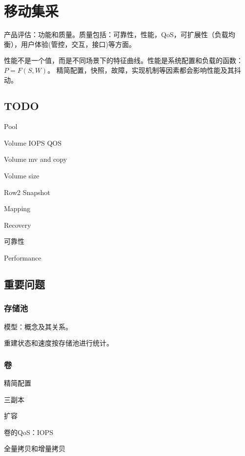 \chapter{移动集采}

产品评估：功能和质量。质量包括：可靠性，性能，QoS，可扩展性（负载均衡），用户体验(管控，交互，接口)等方面。

性能不是一个值，而是不同场景下的特征曲线。性能是系统配置和负载的函数：$P=F(S, W)$。
精简配置，快照，故障，实现机制等因素都会影响性能及其抖动。

\section{TODO}

\begin{enumbox}
\item Pool
\item Volume IOPS QOS
\item Volume mv and copy
\item Volume size
\item Row2 Snapshot
\item Mapping
\item Recovery
\item 可靠性
\item Performance
\end{enumbox}

\section{重要问题}

\subsection{存储池}

模型：概念及其关系。

重建状态和速度按存储池进行统计。

\subsection{卷}

\begin{enumbox}
    \item 精简配置
    \item 三副本
    \item 扩容
    \item 卷的QoS：IOPS
    \item 全量拷贝和增量拷贝
\end{enumbox}


